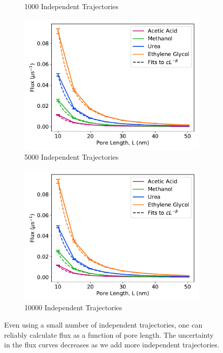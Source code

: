 \documentclass{article}
\begin{document}
\begin{figure}
\begin{subfigure}{0.45\textwidth}
  \caption{1000 Independent Trajectories}\label{fig:N1000}
  \end{subfigure}
  \begin{subfigure}{0.45\textwidth}
  \includegraphics[width=\textwidth]{flux_curves_N5000.pdf}
  \caption{5000 Independent Trajectories}\label{fig:N5000}
  \end{subfigure}
  \begin{subfigure}{0.45\textwidth}
  \includegraphics[width=\textwidth]{flux_curves_N9984.pdf}
  \caption{10000 Independent Trajectories}\label{fig:N10000}
  \end{subfigure}
  \caption{Even using a small number of independent trajectories, one can
  reliably calculate flux as a function of pore length. The uncertainty in
  the flux curves decreases as we add more independent trajectories.}\label{fig:flux_curve_sensitivity}
  \end{figure}
  
\end{document}
